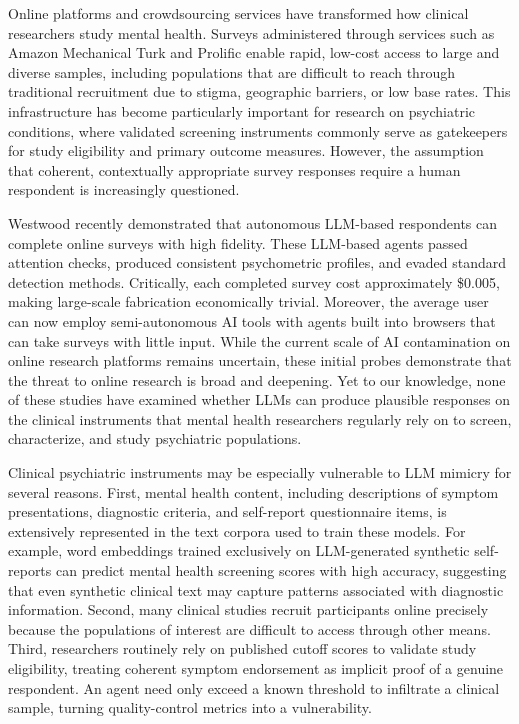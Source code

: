 \documentclass[10pt]{article}
\begin{document}
\newpage


Online platforms and crowdsourcing services have transformed how clinical researchers study mental health\cite{gillan2021}. Surveys administered through services such as Amazon Mechanical Turk and Prolific enable rapid, low-cost access to large and diverse samples, including populations that are difficult to reach through traditional recruitment due to stigma, geographic barriers, or low base rates\cite{chandler2016}. This infrastructure has become particularly important for research on psychiatric conditions, where validated screening instruments commonly serve as gatekeepers for study eligibility and primary outcome measures. However, the assumption that coherent, contextually appropriate survey responses require a human respondent is increasingly questioned.

Westwood recently demonstrated that autonomous LLM-based respondents can complete online surveys with high fidelity\cite{westwood2025}. These LLM-based agents passed attention checks, produced consistent psychometric profiles, and evaded standard detection methods. Critically, each completed survey cost approximately \$0.005, making large-scale fabrication economically trivial. Moreover, the average user can now employ semi-autonomous AI tools with agents built into browsers that can take surveys with little input\cite{ning_survey_2025}. While the current scale of AI contamination on online research platforms remains uncertain, these initial probes demonstrate that the threat to online research is broad and deepening\cite{chen_estimating_2026, panizza_how_2026}. Yet to our knowledge, none of these studies have examined whether LLMs can produce plausible responses on the clinical instruments that mental health researchers regularly rely on to screen, characterize, and study psychiatric populations.

Clinical psychiatric instruments may be especially vulnerable to LLM mimicry for several reasons. First, mental health content, including descriptions of symptom presentations, diagnostic criteria, and self-report questionnaire items, is extensively represented in the text corpora used to train these models\cite{Jin2025ApplicationsLLMsMentalHealth}. For example, word embeddings trained exclusively on LLM-generated synthetic self-reports can predict mental health screening scores with high accuracy\cite{moell2026}, suggesting that even synthetic clinical text may capture patterns associated with diagnostic information. Second, many clinical studies recruit participants online precisely because the populations of interest are difficult to access through other means\cite{chandler2016}. Third, researchers routinely rely on published cutoff scores to validate study eligibility, treating coherent symptom endorsement as implicit proof of a genuine respondent. An agent need only exceed a known threshold to infiltrate a clinical sample, turning quality-control metrics into a vulnerability.
\end{document}
